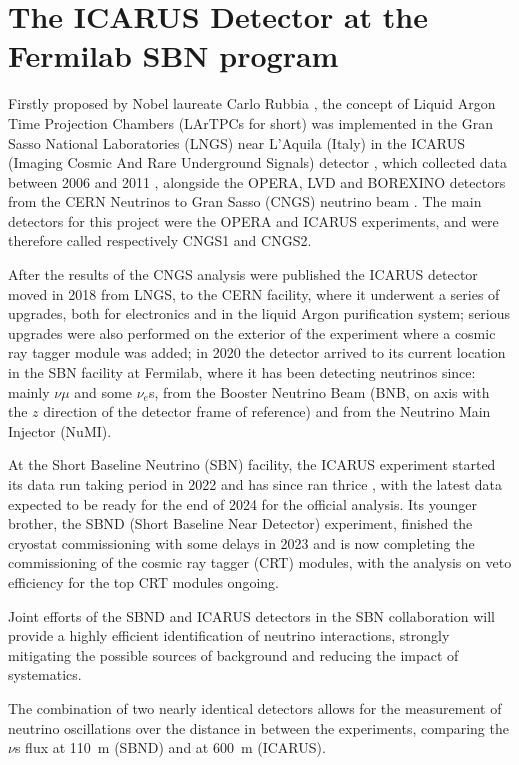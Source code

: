 \chapter{The ICARUS Detector at the Fermilab SBN program}

Firstly proposed by Nobel laureate Carlo Rubbia \cite{Rubbia:1977zz}, the concept of Liquid Argon Time Projection Chambers (LArTPCs for short) was implemented in the Gran Sasso National Laboratories (LNGS) near L'Aquila (Italy) in the ICARUS (Imaging Cosmic And Rare Underground Signals) detector \cite{Bettini:1991fh, Cennini:1994pk, Cennini:1995tt, ICARUS:1995nrd}, which collected data between 2006 and 2011 \cite{Rubbia:2011ft}, alongside the OPERA, LVD and BOREXINO detectors from the CERN Neutrinos to Gran Sasso (CNGS) neutrino beam \cite{Kodama:2004db}. The main detectors for this project were the OPERA and ICARUS experiments, and were therefore called respectively CNGS1 and CNGS2.

After the results of the CNGS analysis were published the ICARUS detector moved in 2018 from LNGS, to the CERN facility, where it underwent a series of upgrades, both for electronics and in the liquid Argon purification system; serious upgrades were also performed on the exterior of the experiment where a cosmic ray tagger module was added; in 2020 the detector arrived to its current location in the SBN facility at Fermilab, where it has been detecting neutrinos since: mainly $\nu\mu$ and some $\nu_e$s, from the Booster Neutrino Beam (BNB, on axis with the $z$ direction of the detector frame of reference) and from the Neutrino Main Injector (NuMI). 

At the Short Baseline Neutrino (SBN) facility, the ICARUS experiment started its data run taking period in 2022 and has since ran thrice \cite{ICARUS:2023gpo}, with the latest data expected to be ready for the end of 2024 for the official analysis. Its younger brother, the SBND (Short Baseline Near Detector) experiment, finished the cryostat commissioning with some delays in 2023 and is now completing the commissioning of the cosmic ray tagger (CRT) modules, with the analysis on veto efficiency for the top CRT modules ongoing. 

Joint efforts of the SBND and ICARUS detectors in the SBN collaboration will provide a highly efficient identification of neutrino interactions, strongly mitigating the possible sources of background and reducing the impact of systematics. 

The combination of two nearly identical detectors allows for the measurement of neutrino oscillations over the distance in between the experiments, comparing the $\nu$s flux at \SI{110}{\meter} (SBND) and at \SI{600}{\meter} (ICARUS). 

